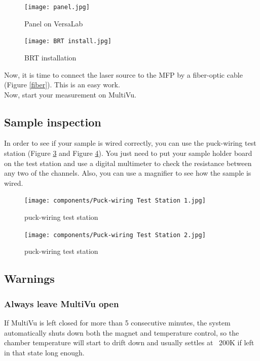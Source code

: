 \documentclass{article}
\begin{document}
            \begin{figure}[H]
                \centering
                \texttt{[image: panel.jpg]}
                \caption{Panel on VersaLab}
                \label{panel}
            \end{figure}

            \begin{figure}[H]
                \centering
                \texttt{[image: BRT install.jpg]}
                \caption{BRT installation}
                \label{BRT install}
            \end{figure}

            Now, it is time to connect the laser source to the MFP by a fiber-optic cable (Figure \ref{fiber}). This is an easy work.\\

            Now, start your measurement on MultiVu.
            
    \subsection{Sample inspection}

    In order to see if your sample is wired correctly, you can use the puck-wiring test station (Figure \ref{station1} and Figure \ref{station2}). You just need to put your sample holder board on the test station and use a digital multimeter to check the resistance between any two of the channels. Also, you can use a magnifier to see how the sample is wired.

        \begin{figure}[H]
        \centering
        \texttt{[image: components/Puck-wiring Test Station 1.jpg]}
        \caption{puck-wiring test station}
        \label{station1}
        \end{figure}

        \begin{figure}[H]
        \centering
        \texttt{[image: components/Puck-wiring Test Station 2.jpg]}
        \caption{puck-wiring test station}
        \label{station2}
        \end{figure}

    \subsection{Warnings}
        \subsubsection{Always leave MultiVu open}
            If MultiVu is left closed for more than 5 consecutive minutes, the system automatically shuts down both the magnet and temperature control, so the chamber temperature will start to drift down and usually settles at ~200K if left in that state long enough.
        
\end{document}
